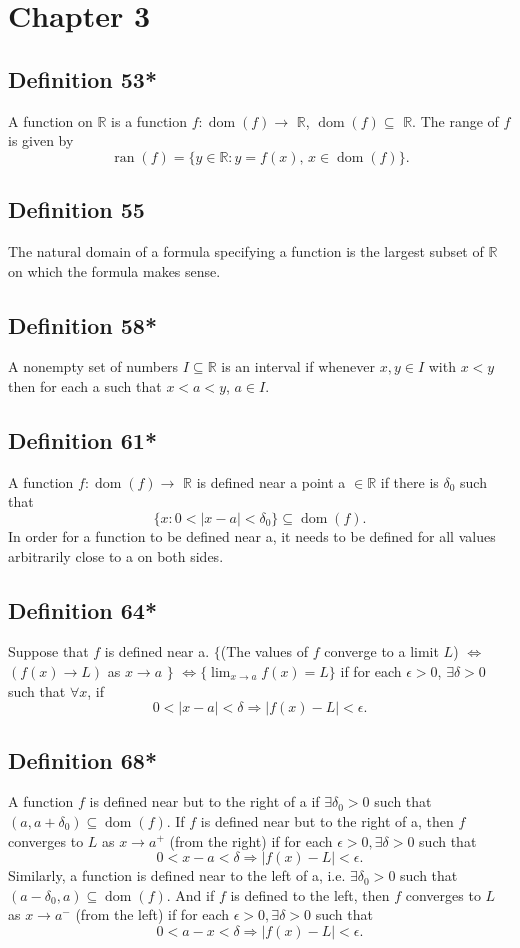 \documentclass{article}
\DeclareMathOperator\dom{dom}
\DeclareMathOperator\ran{ran}
\begin{document}
\section*{Chapter 3}
\subsection{Definition 53*}
A function on $\mathbb{R}$ is a function $f: \dom (f) \to $ $\mathbb{R}$, $\dom (f) \subseteq$ $\mathbb{R}$.
The range of $f$ is given by \[
\ran(f) = \{ y \in \mathbb{R} : y = f(x), \, x \in \dom(f) \}.
\]

\subsection{Definition 55}
The natural domain of a formula specifying a function is the largest subset of $\mathbb{R}$
on which the formula makes sense.

\subsection{Definition 58*}
A nonempty set of numbers $I\subseteq\mathbb{R}$ is an interval if whenever
$x,y \in I$ with $x<y$ then for each a such that $x<a<y$, $a \in I$.

\subsection{Definition 61*}
A function $f: \dom (f) \to $ $\mathbb{R}$ is defined near a point a $ \in \mathbb{R}$
if there is $\delta_0$ such that \[
\{ x:0<|x-a|<\delta_0 \} \subseteq \dom(f).
\]
In order for a function to be defined near a, it needs to be defined for all values
arbitrarily close to a on both sides.
\subsection{Definition 64*}
Suppose that $f$ is defined near a. $\{$(The values of $f$ converge to a limit
$L$) $\Longleftrightarrow$ $(f(x) \to L)$ as $x \to a$ $\}$ $\Longleftrightarrow \{ \lim_{x \to a}f(x) = L \}$ if for each $\epsilon>0$, $\exists \delta > 0$ such that $\forall x$, if \[
0<|x-a|<\delta \Longrightarrow |f(x)-L| < \epsilon.
\]

\subsection{Definition 68*}
A function $f$ is defined near but to the right of a if $\exists \delta_0>0$ such that
$(a, a+\delta_0) \subseteq \dom(f)$. If $f$ is defined near but to the right of a, then $f$
converges to $L$ as $x \to a^+$ (from the right) if for each $\epsilon > 0, \exists \delta > 0$ such that \[
0<x-a<\delta \Longrightarrow |f(x)-L| < \epsilon.
\]
Similarly, a function is defined near to the left of a, i.e.
$\exists \delta_0>0$ such that
$(a-\delta_0, a) \subseteq \dom(f)$. And if $f$ is defined to the left, then
$f$ converges to $L$ as $x \to a^-$ (from the left) if for each $\epsilon >0, \exists \delta >0$ such that \[
0<a-x<\delta \Longrightarrow |f(x)-L|<\epsilon.
\]
\end{document}
